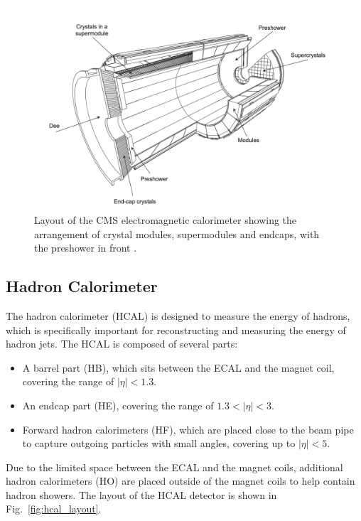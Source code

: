\begin{figure}
    \begin{minipage}[t]{\linewidth}\centering
        \includegraphics[width=15cm]{ecal_layout.png}
    \end{minipage}
    \caption{Layout of the CMS electromagnetic calorimeter showing the arrangement of crystal
    modules, supermodules and endcaps, with the preshower in front \cite{cms:cms_experiment}.}
    \label{fig:ecal_layout}
\end{figure}


\subsection{Hadron Calorimeter}
\label{subsec:hcal}

The hadron calorimeter (HCAL) is designed to measure the energy of hadrons, which is specifically important for reconstructing and measuring the energy of
hadron jets. The HCAL is composed of several parts: 

\begin{itemize}
    \item A barrel part (HB), which sits between the ECAL and the magnet coil, covering the range of $|\eta| < 1.3$. 
    \item An endcap part (HE), covering the range of $1.3 < |\eta|< 3$.
    \item Forward hadron calorimeters (HF), which are placed close to the beam pipe to capture outgoing particles with small angles, covering up to $|\eta| < 5$.
\end{itemize}

Due to the limited space between the ECAL and the magnet coils, additional hadron calorimeters (HO) are placed outside of the magnet coils to help 
contain hadron showers. The layout of the HCAL detector is shown in Fig.~\ref{fig:hcal_layout}.

